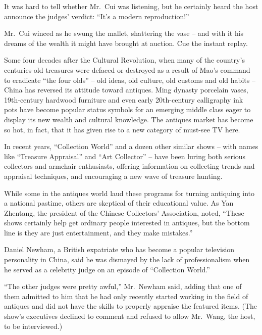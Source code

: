 ﻿\documentclass[12pt]{article}
\begin{document}
It was hard to tell whether Mr.~Cui was listening, but he certainly heard the host announce the
judges' verdict: ``It's a modern reproduction!''

Mr.~Cui winced as he swung the mallet, shattering the vase -- and with it his dreams of the wealth
it might have brought at auction. Cue the instant replay.

Some four decades after the Cultural Revolution, when many of the country's centuries-old treasures
were defaced or destroyed as a result of Mao's command to eradicate ``the four olds'' -- old ideas,
old culture, old customs and old habits -- China has reversed its attitude toward antiques. Ming
dynasty porcelain vases, 19th-century hardwood furniture and even early 20th-century calligraphy ink
pots have become popular status symbols for an emerging middle class eager to display its new wealth
and cultural knowledge. The antiques market has become so hot, in fact, that it has given rise to a
new category of must-see TV here.

In recent years, ``Collection World'' and a dozen other similar shows -- with names like ``Treasure
Appraisal'' and ``Art Collector'' -- have been luring both serious collectors and armchair
enthusiasts, offering information on collecting trends and appraisal techniques, and encouraging a
new wave of treasure hunting.

While some in the antiques world laud these programs for turning antiquing into a national pastime,
others are skeptical of their educational value. As Yan Zhentang, the president of the Chinese
Collectors' Association, noted, ``These shows certainly help get ordinary people interested in
antiques, but the bottom line is they are just entertainment, and they make mistakes.''


Daniel Newham, a British expatriate who has become a popular television personality in China, said
he was dismayed by the lack of professionalism when he served as a celebrity judge on an episode of
``Collection World.''

``The other judges were pretty awful,'' Mr.~Newham said, adding that one of them admitted to him
that he had only recently started working in the field of antiques and did not have the skills to
properly appraise the featured items. (The show's executives declined to comment and refused to
allow Mr.~Wang, the host, to be interviewed.)
\end{document}
